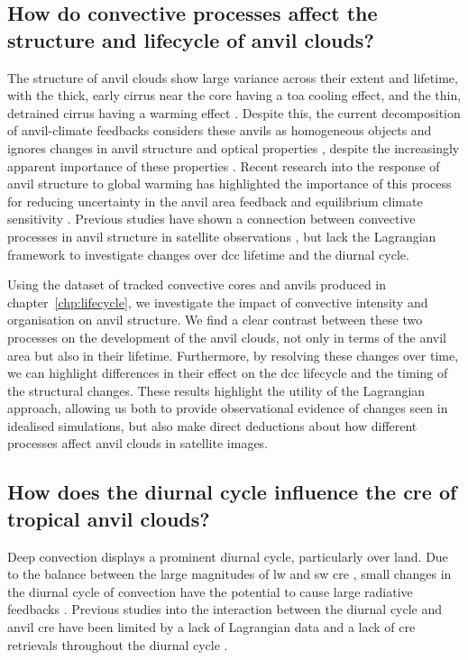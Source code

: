 \subsection{How do convective processes affect the structure and lifecycle of anvil clouds?}

The structure of anvil clouds show large variance across their extent and lifetime, with the thick, early cirrus near the core having a \acrshort{toa} cooling effect, and the thin, detrained cirrus having a warming effect \citep{berry_cloud_2014}.
Despite this, the current decomposition of anvil-climate feedbacks considers these anvils as homogeneous objects and ignores changes in anvil structure and optical properties \citep{sherwood_assessment_2020}, despite the increasingly apparent importance of these properties \citep{raghuraman_observational_2024}.
Recent research into the response of anvil structure to global warming has highlighted the importance of this process for reducing uncertainty in the anvil area feedback \citep{mckim_weak_2024} and equilibrium climate sensitivity \citep{sokol_greater_2024}.
Previous studies have shown a connection between convective processes in anvil structure in satellite observations \citep{protopapadaki_upper_2017, takahashi_relationships_2017}, but lack the Lagrangian framework to investigate changes over \acrshort{dcc} lifetime and the diurnal cycle.

Using the dataset of tracked convective cores and anvils produced in chapter~\ref{chp:lifecycle}, we investigate the impact of convective intensity and organisation on anvil structure.
We find a clear contrast between these two processes on the development of the anvil clouds, not only in terms of the anvil area but also in their lifetime.
Furthermore, by resolving these changes over time, we can highlight differences in their effect on the \acrshort{dcc} lifecycle and the timing of the structural changes.
These results highlight the utility of the Lagrangian approach, allowing us both to provide observational evidence of changes seen in idealised simulations, but also make direct deductions about how different processes affect anvil clouds in satellite images.

\subsection{How does the diurnal cycle influence the \acrshort{cre} of tropical anvil clouds?}

Deep convection displays a prominent diurnal cycle, particularly over land.
Due to the balance between the large magnitudes of \acrshort{lw} and \acrshort{sw} \acrshort{cre} \citep{hartmann_tropical_2016}, small changes in the diurnal cycle of convection have the potential to cause large radiative feedbacks \citep{nowicki_observations_2004}.
Previous studies into the interaction between the diurnal cycle and anvil \acrshort{cre} have been limited by a lack of Lagrangian data \citep{bouniol_macrophysical_2016} and a lack of \acrshort{cre} retrievals throughout the diurnal cycle \citep{bouniol_life_2021}.

